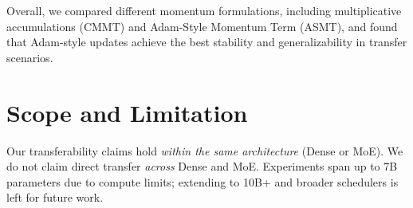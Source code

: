 \documentclass[letterpaper]{article} %
\begin{document}
Overall, we compared different momentum formulations, including multiplicative accumulations (CMMT) and Adam-Style Momentum Term (ASMT), and found that Adam-style updates achieve the best stability and generalizability in transfer scenarios.


\section{Scope and Limitation}
Our transferability claims hold \emph{within the same architecture} (Dense or MoE). We do not claim direct transfer \emph{across} Dense and MoE. Experiments span up to 7B parameters due to compute limits; extending to 10B+ and broader schedulers is left for future work.
\end{document}
